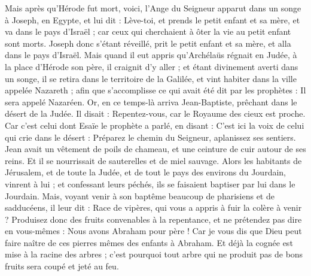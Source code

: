 \begin{multicols}{2}
Mais après qu'Hérode fut mort, voici, l'Ange du Seigneur apparut dans un songe à Joseph, en Egypte,
et lui dit : Lève-toi, et prends le petit enfant et sa mère, et va dans le pays d'Israël ; car ceux qui cherchaient à ôter la vie au petit enfant sont morts.
Joseph donc s'étant réveillé, prit le petit enfant et sa mère, et alla dans le pays d'Israël.
Mais quand il eut appris qu'Archélaüs régnait en Judée, à la place d'Hérode son père, il craignit d'y aller ; et étant divinement averti dans un songe, il se retira dans le territoire de la Galilée,
et vint habiter dans la ville appelée Nazareth ; afin que s’accomplisse ce qui avait été dit par les prophètes : Il sera appelé Nazaréen{}.
\VerseOne{}Or, en ce temps-là arriva Jean-Baptiste, prêchant dans le désert de la Judée.
Il disait : Repentez-vous, car le Royaume des cieux est proche.
Car c'est celui dont Esaïe le prophète a parlé, en disant : C’est ici la voix de celui qui crie dans le désert : Préparez le chemin du Seigneur, aplanissez ses sentiers.
Jean avait un vêtement de poils de chameau, et une ceinture de cuir autour de ses reins. Et il se nourrissait de sauterelles et de miel sauvage.
Alors les habitants de Jérusalem, et de toute la Judée, et de tout le pays des environs du Jourdain, vinrent à lui ;
et confessant leurs péchés, ils se faisaient baptiser par lui dans le Jourdain.
Mais, voyant venir à son baptême beaucoup de pharisiens et de sadducéens, il leur dit : Race de vipères, qui vous a appris à fuir la colère à venir ?
Produisez donc des fruits convenables à la repentance,
et ne prétendez pas dire en vous-mêmes : Nous avons Abraham pour père ! Car je vous dis que Dieu peut faire naître de ces pierres mêmes des enfants à Abraham.
Et déjà la cognée est mise à la racine des arbres ; c'est pourquoi tout arbre qui ne produit pas de bons fruits sera coupé et jeté au feu.

\end{multicols}
